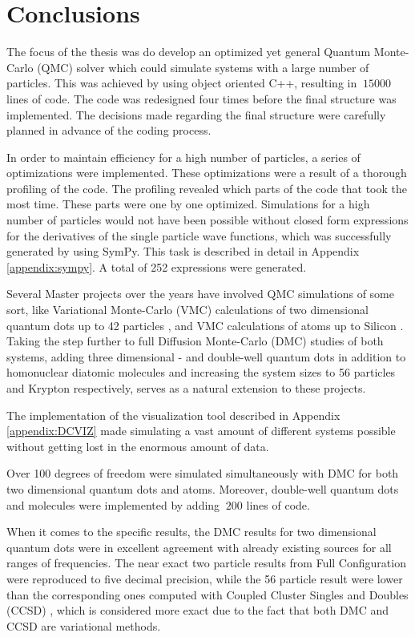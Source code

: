 \chapter{Conclusions}

The focus of the thesis was do develop an optimized yet general Quantum Monte-Carlo (QMC) solver which could simulate systems with a large number of particles. This was achieved by using object oriented C++, resulting in $~15000$ lines of code. The code was redesigned four times before the final structure was implemented. The decisions made regarding the final structure were carefully planned in advance of the coding process. 

In order to maintain efficiency for a high number of particles, a series of optimizations were implemented. These optimizations were a result of a thorough profiling of the code. The profiling revealed which parts of the code that took the most time. These parts were one by one optimized. Simulations for a high number of particles would not have been possible without closed form expressions for the derivatives of the single particle wave functions, which was successfully generated by using SymPy. This task is described in detail in Appendix \ref{appendix:sympy}. A total of 252 expressions were generated.

Several Master projects over the years have involved QMC simulations of some sort, like Variational Monte-Carlo (VMC) calculations of two dimensional quantum dots up to 42 particles \cite{larseivind}, and VMC calculations of atoms up to Silicon \cite{vmcAtoms}. Taking the step further to full Diffusion Monte-Carlo (DMC) studies of both systems, adding three dimensional - and double-well quantum dots in addition to homonuclear diatomic molecules and increasing the system sizes to 56 particles and Krypton respectively, serves as a natural extension to these projects.   

The implementation of the visualization tool described in Appendix \ref{appendix:DCVIZ} made simulating a vast amount of different systems possible without getting lost in the enormous amount of data.

Over 100 degrees of freedom were simulated simultaneously with DMC for both two dimensional quantum dots and atoms. Moreover, double-well quantum dots and molecules were implemented by adding $~200$ lines of code.

When it comes to the specific results, the DMC results for two dimensional quantum dots were in excellent agreement with already existing sources for all ranges of frequencies. The near exact two particle results from Full Configuration \cite{Olsen} were reproduced to five decimal precision, while the 56 particle result were lower than the corresponding ones computed with Coupled Cluster Singles and Doubles (CCSD) \cite{Hirth}, which is considered more exact due to the fact that both DMC and CCSD are variational methods. 

